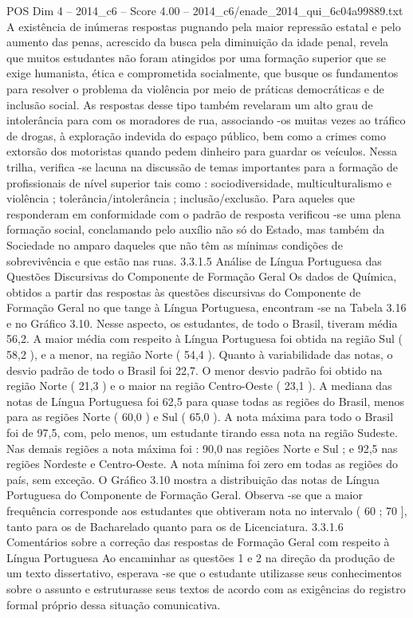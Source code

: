\begin{textsample}{POS Dim 4 – 2014\_c6 – Score 4.00 – 2014\_c6/enade\_2014\_qui\_6c04a99889.txt}
A existência de inúmeras respostas pugnando pela maior repressão estatal e pelo aumento das penas, acrescido da busca pela diminuição da idade penal, revela que muitos estudantes não foram atingidos por uma formação superior que se exige humanista, ética e comprometida socialmente, que busque os fundamentos para resolver o problema da violência por meio de práticas democráticas e de inclusão social.
As respostas desse tipo também revelaram um alto grau de intolerância para com os moradores de rua, associando -os muitas vezes ao tráfico de drogas, à exploração indevida do espaço público, bem como a crimes como extorsão dos motoristas quando pedem dinheiro para guardar os veículos.
Nessa trilha, verifica -se lacuna na discussão de temas importantes para a formação de profissionais de nível superior tais como : sociodiversidade, multiculturalismo e violência ; tolerância/intolerância ; inclusão/exclusão.
Para aqueles que responderam em conformidade com o padrão de resposta verificou -se uma plena formação social, conclamando pelo auxílio não só do Estado, mas também da Sociedade no amparo daqueles que não têm as mínimas condições de sobrevivência e que estão nas ruas. 3.3.1.5 Análise de Língua Portuguesa das Questões Discursivas do Componente de Formação Geral Os dados de Química, obtidos a partir das respostas às questões discursivas do Componente de Formação Geral no que tange à Língua Portuguesa, encontram -se na Tabela 3.16 e no Gráfico 3.10.
Nesse aspecto, os estudantes, de todo o Brasil, tiveram média 56,2.
A maior média com respeito à Língua Portuguesa foi obtida na região Sul ( 58,2 ), e a menor, na região Norte ( 54,4 ).
Quanto à variabilidade das notas, o desvio padrão de todo o Brasil foi 22,7.
O menor desvio padrão foi obtido na região Norte ( 21,3 ) e o maior na região Centro-Oeste ( 23,1 ).
A mediana das notas de Língua Portuguesa foi 62,5 para quase todas as regiões do Brasil, menos para as regiões Norte ( 60,0 ) e Sul ( 65,0 ).
A nota máxima para todo o Brasil foi de 97,5, com, pelo menos, um estudante tirando essa nota na região Sudeste.
Nas demais regiões a nota máxima foi : 90,0 nas regiões Norte e Sul ; e 92,5 nas regiões Nordeste e Centro-Oeste.
A nota mínima foi zero em todas as regiões do país, sem exceção.
O Gráfico 3.10 mostra a distribuição das notas de Língua Portuguesa do Componente de Formação Geral.
Observa -se que a maior frequência corresponde aos estudantes que obtiveram nota no intervalo ( 60 ; 70 ], tanto para os de Bacharelado quanto para os de Licenciatura. 3.3.1.6 Comentários sobre a correção das respostas de Formação Geral com respeito à Língua Portuguesa Ao encaminhar as questões 1 e 2 na direção da produção de um texto dissertativo, esperava -se que o estudante utilizasse seus conhecimentos sobre o assunto e estruturasse seus textos de acordo com as exigências do registro formal próprio dessa situação comunicativa.

\end{textsample}
